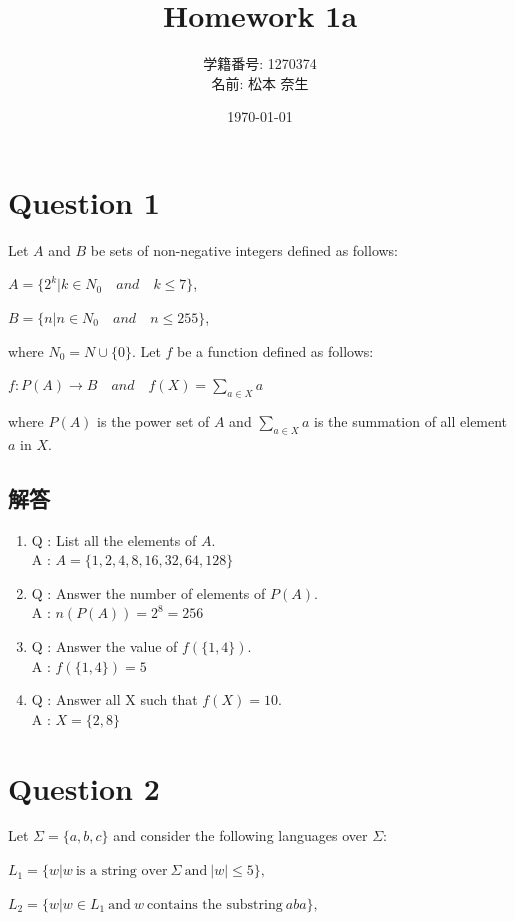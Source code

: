 \documentclass[uplatex,a4paper,11pt]{jsarticle}
\title{Homework 1a}
\author{学籍番号: 1270374 \\ 名前: 松本 奈生}
\date{\today}
\begin{document}
\maketitle

\section*{Question 1}
Let $A$ and $B$ be sets of non-negative integers defined as follows:

$
      A = \{2^k | k \in N_0 \quad and \quad k \le 7\}
$,

$
      B = \{n | n \in N_0 \quad and \quad n \le 255\}
$,

where $N_0 = N \cup \{0\}$. 
Let $f$ be a function defined as follows:

$f:P(A) \to B \quad and \quad f(X) = \sum_{a\in X} a$

where $P(A)$ is the power set of $A$ and $\sum_{a\in X} a$ is the 
summation of all element $a$ in $X$.

\subsection*{解答}
\begin{enumerate}
      \item Q : List all the elements of $A$. \\
            A : $A = \{1,2,4,8,16,32,64,128\}$
      \item Q : Answer the number of elements of $P(A)$. \\
            A : $n(P(A)) = 2^8 = 256$
      \item Q : Answer the value of $f(\{1, 4\})$. \\
            A : $f(\{1,4\}) = 5$
      \item Q : Answer all X such that $f(X) = 10$. \\
            A : $X = \{2,8\}$
\end{enumerate}

\section*{Question 2}
Let $\Sigma = \{a,b,c\}$ and consider the following languages over $\Sigma$:


$L_1 = \{w | w \ \text{is a string over}  \ \Sigma  \  \text{and} \ |w| \le 5\},$

$L_2 = \{w | w \in L_1 \ \text{and} \ w \ \text{contains the substring} \ a b a \},$
\end{document}
